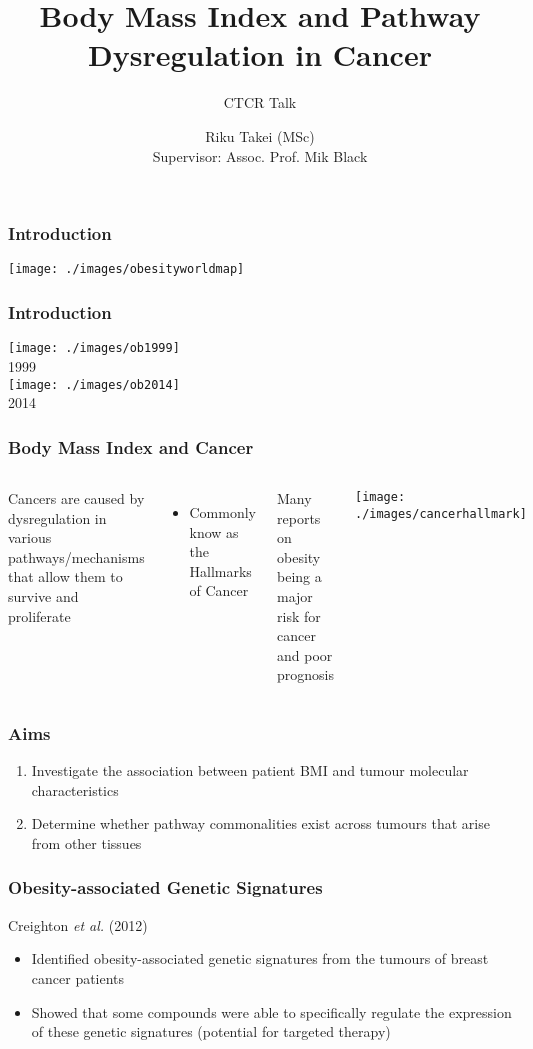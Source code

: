 \documentclass[handout]{beamer}
\title[BMI and Cancer]{Body Mass Index and Pathway Dysregulation in Cancer}
\subtitle{CTCR Talk}
\author[Riku Takei]{Riku Takei (MSc)\\Supervisor: Assoc. Prof. Mik Black}
\institute{Department of Biochemistry, University of Otago}
\begin{document}
{
	\begin{frame}[noframenumbering]
		\titlepage
	\end{frame}
}

\begin{frame}
	\frametitle{Introduction}
	\begin{center}
		\texttt{[image: ./images/obesityworldmap]}
	\end{center}
\end{frame}

\begin{frame}
	\frametitle{Introduction}
	\begin{center}
		\texttt{[image: ./images/ob1999]}\\
		1999\\
		\texttt{[image: ./images/ob2014]}\\
		2014
	\end{center}
\end{frame}

\begin{frame}
	\frametitle{Body Mass Index and Cancer}
	\begin{columns}
		{\footnotesize
			Cancers are caused by dysregulation in various pathways/mechanisms that allow them to survive and proliferate
			\begin{itemize}
				\item Commonly know as the Hallmarks of Cancer
			\end{itemize}
			Many reports on obesity being a major risk for cancer and poor prognosis
		}
		\texttt{[image: ./images/cancerhallmark]}
	\end{columns}
\end{frame}

\begin{frame}
	\frametitle{Aims}
	\begin{enumerate}
		\item Investigate the association between patient BMI and tumour molecular characteristics
		\item Determine whether pathway commonalities exist across tumours that arise from other tissues
	\end{enumerate}
\end{frame}

\begin{frame}
	\frametitle{Obesity-associated Genetic Signatures}
	Creighton \textit{et al.} (2012)
	\begin{itemize}
		\item Identified obesity-associated genetic signatures from the tumours of breast cancer patients
		\item Showed that some compounds were able to specifically regulate the expression of these genetic signatures (potential for targeted therapy)
	\end{itemize}
\end{frame}
\end{document}
